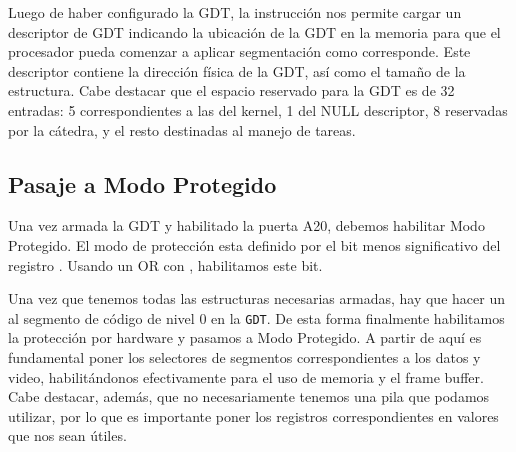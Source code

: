 Luego de haber configurado la GDT, la instrucción  nos permite cargar un descriptor de GDT indicando la ubicación de la GDT en la memoria para que el procesador pueda comenzar a aplicar segmentación como corresponde. Este descriptor contiene la dirección física de la GDT, así como el tamaño de la estructura. Cabe destacar que el espacio reservado para la GDT es de 32 entradas: 5 correspondientes a las del kernel, 1 del NULL descriptor, 8 reservadas por la cátedra, y el resto destinadas al manejo de tareas.

\subsection{Pasaje a Modo Protegido}

Una vez armada la GDT y habilitado la puerta A20, debemos habilitar Modo Protegido. El modo de protección esta definido por el bit menos significativo del registro . Usando un OR con , habilitamos este bit.

Una vez que tenemos todas las estructuras necesarias armadas, hay que hacer un  al segmento de código de nivel 0 en la \texttt{GDT}. De esta forma finalmente habilitamos la protección por hardware y pasamos a Modo Protegido. A partir de aquí es fundamental poner los selectores de segmentos correspondientes a los datos y video, habilitándonos efectivamente para el uso de memoria y el frame buffer. Cabe destacar, además, que no necesariamente tenemos una pila que podamos utilizar, por lo que es importante poner los registros correspondientes en valores que nos sean útiles.
